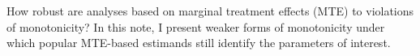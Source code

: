 How robust are analyses based on marginal treatment effects (MTE)
to violations of \citet{Imbens1994Identification} monotonicity? In
this note, I present weaker forms of monotonicity under which popular
MTE-based estimands still identify the parameters of interest.